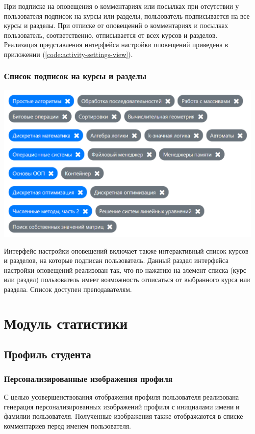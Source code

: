 \documentclass[12pt, a4paper, oneside]{article}
\begin{document}
При подписке на оповещения о комментариях или посылках при отсутствии у пользователя подписок на курсы или разделы, пользователь подписывается на все курсы и разделы. При отписке от оповещений о комментариях и посылках пользователь, соответственно, отписывается от всех курсов и разделов. Реализация представления интерфейса настройки оповещений приведена в приложении (\ref{code:activity-settings-view}).
\subsubsection{Список подписок на курсы и разделы}
\begin{center}
    \includegraphics[scale=0.45]{courses-contests-subscriptions}
\end{center}

Интерфейс настройки оповещений включает также интерактивный список курсов и разделов, на которые подписан пользователь. Данный раздел интерфейса настройки оповещений реализован так, что по нажатию на элемент списка (курс или раздел) пользователь имеет возможность отписаться от выбранного курса или раздела. Список доступен преподавателям.
\newpage

\section{Модуль статистики}
\subsection{Профиль студента}
\subsubsection{Персонализированные изображения профиля}
С целью усовершенствования отображения профиля пользователя реализована генерация персонализированных изображений профиля с инициалами имени и фамилии пользователя. Полученные изображения также отображаются в списке комментариев перед именем пользователя.
\end{document}
